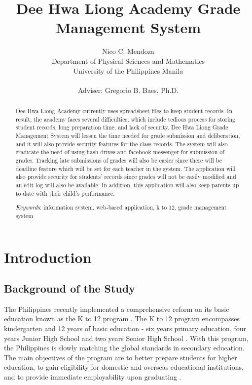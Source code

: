 \documentclass[11pt,a4paper,titlepage]{article}
\title {Dee Hwa Liong Academy Grade Management System}
\author {Nico C. Mendoza \\ Department of Physical Sciences and Mathematics \\ University of the Philippines Manila \\ \\ Adviser: Gregorio B. Baes, Ph.D.
}
\date{}
\let\stdsection\section
\renewcommand\section{\newpage\stdsection}
\newcommand{\Keywords}[1]{\par\noindent 
{\small{\em Keywords\/}: #1}}
\begin{document}
\maketitle
\doublespacing

\begin{abstract}
\thispagestyle{plain}
\setcounter{page}{2}
Dee Hwa Liong Academy currently uses spreadsheet files to keep student records. In result, the academy faces several difficulties, which include tedious process for storing student records, long preparation time, and lack of security. Dee Hwa Liong Grade Management System will lessen the time needed for grade submission and deliberation, and it will also provide security features for the class records. The system will also eradicate the need of using flash drives and facebook messenger for submission of grades. Tracking late submissions of grades will also be easier since there will be deadline feature which will be set for each teacher in the system. The application will also provide security for students' records since grades will not be easily modified and an edit log will also be available. In addition, this application will also keep parents up to date with their child’s performance.
\Keywords{information system, web-based application, k to 12, grade management system}
\end{abstract}

\setcounter{page}{3}
\setcounter{tocdepth}{3}
\tableofcontents
\newpage

\section{Introduction}
\setcounter{page}{1}
\subsection{Background of the Study}

The Philippines recently implemented a comprehensive reform on its basic education known as the K to 12 program \cite{Okabe}. The K to 12 program encompasses kindergarten and 12 years of basic education - six years primary education, four years Junior High School and two years Senior High School \cite{Gazette}. With this program, the Philippines is slowly matching the global standards in secondary education. The main objectives of the program are to better prepare students for higher education, to gain eligibility for domestic and overseas educational institutions, and to provide immediate employability upon graduating \cite{Okabe}.
\end{document}
